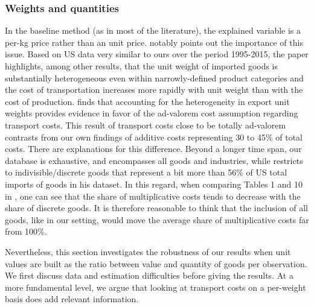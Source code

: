 \documentclass[11pt,twoside, authoryear]{elsarticle}
\begin{document}
\subsubsection{Weights and quantities}

In the baseline method (as in most of the literature), the explained variable is a per-kg price rather than an unit price.
\cite{Lashkaripour_JIE2020} notably points out the importance of this issue.
Based on US data very similar to ours over the period 1995-2015, the paper highlights, among other results, that the unit weight of imported goods is substantially heterogeneous even within narrowly-defined product categories and the cost of transportation increases more rapidly with unit weight than with the cost of production. \cite{Lashkaripour_JIE2020} finds that accounting for the heterogeneity in export unit weights provides evidence in favor of the ad-valorem cost assumption regarding transport costs. This result of transport costs close to be totally ad-valorem contrasts from our own findings of additive costs representing 30 to 45\% of total costs. There are explanations for this difference. Beyond a longer time span, our database is exhaustive, and encompasses all goods and industries, while \citet{Lashkaripour_JIE2020} restricts to indivisible/discrete goods that represent a bit more than 56\% of US total imports of goods in his dataset. In this regard, when comparing Tables 1 and 10 in \citet{Lashkaripour_JIE2020}, one can see that the share of multiplicative costs tends to decrease with the share of discrete goods. It is therefore reasonable to think that the inclusion of all goods, like in our setting, would move the average share of multiplicative costs far from 100\%.

Nevertheless, this section investigates the robustness of our results when unit values are built as the ratio between value and quantity of goods per observation. We first discuss data and estimation difficulties before giving the results. At a more fundamental level, we argue that looking at transport costs on a per-weight basis does add relevant information.
\end{document}
